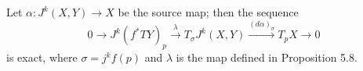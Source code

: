 Let $\alpha: J^k(X, Y) \to X$ be the source map; then the sequence
$$0 \longrightarrow J^k(f^*TY)_p \xrightarrow{\lambda} T_\sigma J^k(X, Y) \xrightarrow{(d\alpha)_\sigma} T_p X \longrightarrow 0$$
is exact, where $\sigma = j^k f(p)$ and $\lambda$ is the map defined in Proposition 5.8.
